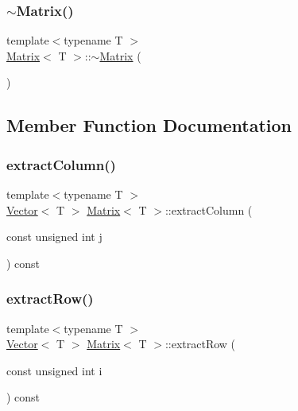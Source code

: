 \mbox{\label{classMatrix_a91aa704de674203e96aece9e1955ccd3}} 
\subsubsection{\texorpdfstring{$\sim$\+Matrix()}{~Matrix()}}
{\footnotesize\ttfamily template$<$typename T $>$ \\
\mbox{\hyperlink{classMatrix}{Matrix}}$<$ T $>$\+::$\sim$\mbox{\hyperlink{classMatrix}{Matrix}} (\begin{DoxyParamCaption}{ }\end{DoxyParamCaption})}



\subsection{Member Function Documentation}
\mbox{\label{classMatrix_a4361c4478b01f7df1173e5b64eccd127}} 
\subsubsection{\texorpdfstring{extract\+Column()}{extractColumn()}}
{\footnotesize\ttfamily template$<$typename T $>$ \\
\mbox{\hyperlink{classVector}{Vector}}$<$ T $>$ \mbox{\hyperlink{classMatrix}{Matrix}}$<$ T $>$\+::extract\+Column (\begin{DoxyParamCaption}\item[{const unsigned int}]{j }\end{DoxyParamCaption}) const\hspace{0.3cm}{\ttfamily [inline]}}

\mbox{\label{classMatrix_a7dded77c0f4c424c98858b5f94c13c16}} 
\subsubsection{\texorpdfstring{extract\+Row()}{extractRow()}}
{\footnotesize\ttfamily template$<$typename T $>$ \\
\mbox{\hyperlink{classVector}{Vector}}$<$ T $>$ \mbox{\hyperlink{classMatrix}{Matrix}}$<$ T $>$\+::extract\+Row (\begin{DoxyParamCaption}\item[{const unsigned int}]{i }\end{DoxyParamCaption}) const\hspace{0.3cm}{\ttfamily [inline]}}

